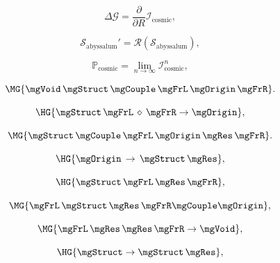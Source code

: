 \[
\Delta \mathcal{G}
=
\frac{\partial}{\partial R}
\mathcal{I}_{\mathrm{cosmic}},
\]

\[
\mathcal{S}_{\mathrm{abyssalum}}'
=
\mathcal{R}(\mathcal{S}_{\mathrm{abyssalum}}),
\]

\[
\mathbb{P}_{\mathrm{cosmic}}
=
\lim_{n\to\infty}
\mathcal{I}_{\mathrm{cosmic}}^n,
\]

\[
\MG{\mgVoid\,\mgStruct\,\mgCouple\,\mgFrL\,\mgOrigin\,\mgFrR}.
\]

\[
\HG{\mgStruct\,\mgFrL\,\diamond\,\mgFrR \rightarrow \mgOrigin},
\]

\[
\MG{\mgStruct\,\mgCouple\,\mgFrL\,\mgOrigin\,\mgRes\,\mgFrR}.
\]

\[
\HG{\mgOrigin\,\rightarrow\,\mgStruct\,\mgRes},
\]

\[
\HG{\mgStruct\,\mgFrL\,\mgRes\,\mgFrR},
\]

\[
\MG{\mgFrL\,\mgStruct\,\mgRes\,\mgFrR \mgCouple \mgOrigin},
\]

\[
\MG{\mgFrL\,\mgRes\,\mgRes\,\mgFrR \rightarrow \mgVoid},
\]

\[
\HG{\mgStruct \rightarrow \mgStruct\,\mgRes},
\]

